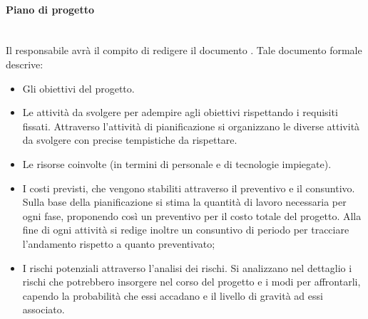     \paragraph{Piano di progetto}
    ~\\
    Il responsabile avrà il compito di redigere il documento \PdP. Tale documento formale descrive:
    \begin{itemize}
        \item Gli obiettivi del progetto.
        \item Le attività da svolgere per adempire agli obiettivi rispettando i requisiti fissati. Attraverso l'attività di pianificazione si organizzano le diverse attività da svolgere con precise tempistiche da rispettare.
        \item Le risorse coinvolte (in termini di personale e di tecnologie impiegate).
        \item I costi previsti, che vengono stabiliti attraverso il preventivo e il consuntivo. Sulla base della pianificazione si stima la quantità di lavoro necessaria per ogni fase, proponendo così un preventivo per il costo totale del progetto. Alla fine di ogni attività si redige inoltre un consuntivo di periodo per tracciare l’andamento rispetto a quanto preventivato;
        \item I rischi potenziali attraverso l'analisi dei rischi. Si analizzano nel dettaglio i rischi che potrebbero insorgere nel corso del progetto e i modi per affrontarli, capendo la probabilità che essi accadano e il livello di gravità ad essi associato.
    \end{itemize}
    
